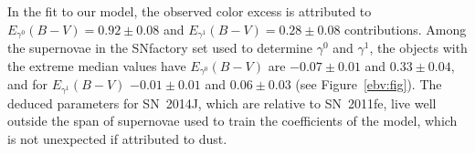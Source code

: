 \documentclass{aastex61}   	%
\begin{document}
In the fit to our model, the observed color excess is attributed to 
$E_{\gamma^0}(B-V)=  0.92 \pm   0.08$ and  $E_{\gamma^1}(B-V)=  0.28 \pm   0.08$
contributions.
Among the supernovae in the SNfactory  set used to determine $\gamma^0$ and $\gamma^1$, the
\color{red}
objects with the extreme median values have 
$E_{\gamma^0}(B-V)$ are $-0.07 \pm 0.01$ and  $  0.33 \pm 0.04$,
and for $E_{\gamma^1}(B-V)$ $-0.01 \pm 0.01$  and
$  0.06 \pm 0.03$ 
(see Figure~\ref{ebv:fig}).
The deduced parameters for SN~2014J, which are relative to SN~2011fe, live well outside the 
span of supernovae used to train the coefficients of the model, which is not unexpected if
attributed to dust. 
\end{document}
